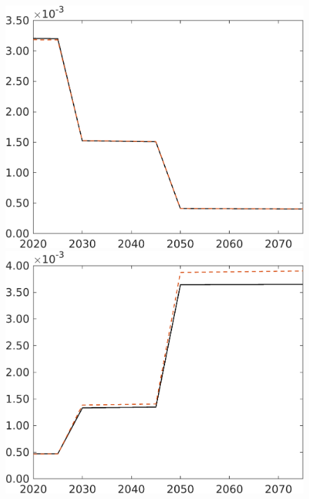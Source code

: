 \begin{figure}[h!!]
\begin{minipage}[]{0.32\textwidth}
	\end{minipage}
	\begin{minipage}[]{0.32\textwidth}
		\includegraphics[width=1\textwidth]{../../codding_model/own_basedOnFried/optimalPol_elastS_DisuSci/figures/all_1705/comp_notaul_OPT_T_NoTaus_Lf_spillover0_sep1_BN0_ineq0_red0_etaa0.79_lgd0.png}
	\end{minipage}
	\begin{minipage}[]{0.32\textwidth}
		\includegraphics[width=1\textwidth]{../../codding_model/own_basedOnFried/optimalPol_elastS_DisuSci/figures/all_1705/comp_notaul_OPT_T_NoTaus_Lg_spillover0_sep1_BN0_ineq0_red0_etaa0.79_lgd0.png}

\end{minipage}
\end{figure}

